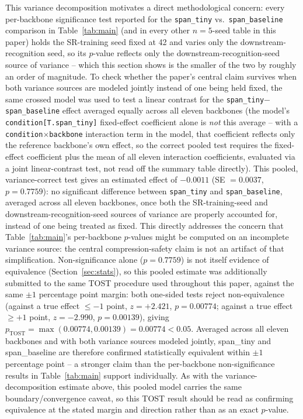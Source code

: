 \documentclass[11pt]{article}
\begin{document}
This variance decomposition motivates a direct methodological concern: every per-backbone significance test reported for the \texttt{span\_tiny} vs.\ \texttt{span\_baseline} comparison in Table~\ref{tab:main} (and in every other $n=5$-seed table in this paper) holds the SR-training seed fixed at 42 and varies only the downstream-recognition seed, so its $p$-value reflects only the downstream-recognition-seed source of variance -- which this section shows is the smaller of the two by roughly an order of magnitude. To check whether the paper's central claim survives when both variance sources are modeled jointly instead of one being held fixed, the same crossed model was used to test a linear contrast for the \texttt{span\_tiny}$-$\texttt{span\_baseline} effect averaged equally across all eleven backbones (the model's \texttt{condition[T.span\_tiny]} fixed-effect coefficient alone is \emph{not} this average -- with a \texttt{condition}$\times$\texttt{backbone} interaction term in the model, that coefficient reflects only the reference backbone's own effect, so the correct pooled test requires the fixed-effect coefficient plus the mean of all eleven interaction coefficients, evaluated via a joint linear-contrast test, not read off the summary table directly). This pooled, variance-correct test gives an estimated effect of $-0.0011$ (SE $=0.0037$, $p=0.7759$): no significant difference between \texttt{span\_tiny} and \texttt{span\_baseline}, averaged across all eleven backbones, once both the SR-training-seed and downstream-recognition-seed sources of variance are properly accounted for, instead of one being treated as fixed. This directly addresses the concern that Table~\ref{tab:main}'s per-backbone $p$-values might be computed on an incomplete variance source: the central compression-safety claim is not an artifact of that simplification. Non-significance alone ($p=0.7759$) is not itself evidence of equivalence (Section~\ref{sec:stats}), so this pooled estimate was additionally submitted to the same TOST procedure used throughout this paper, against the same $\pm 1$ percentage point margin: both one-sided tests reject non-equivalence (against a true effect $\leq -1$ point, $z=+2.421$, $p=0.00774$; against a true effect $\geq +1$ point, $z=-2.990$, $p=0.00139$), giving $p_{\text{TOST}}=\max(0.00774,0.00139)=0.00774<0.05$. Averaged across all eleven backbones and with both variance sources modeled jointly, span\_tiny and span\_baseline are therefore confirmed statistically equivalent within $\pm 1$ percentage point -- a stronger claim than the per-backbone non-significance results in Table~\ref{tab:main} support individually. As with the variance-decomposition estimate above, this pooled model carries the same boundary/convergence caveat, so this TOST result should be read as confirming equivalence at the stated margin and direction rather than as an exact $p$-value.
\end{document}

